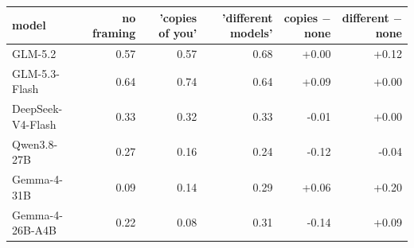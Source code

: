 \begin{tabular}{lrrrrr}
\toprule
\textbf{model} & \textbf{no framing} & \textbf{'copies of you'} & \textbf{'different models'} & \textbf{copies $-$ none} & \textbf{different $-$ none} \\
\midrule
GLM-5.2 & 0.57 & 0.57 & 0.68 & +0.00 & +0.12 \\
GLM-5.3-Flash & 0.64 & 0.74 & 0.64 & +0.09 & +0.00 \\
DeepSeek-V4-Flash & 0.33 & 0.32 & 0.33 & -0.01 & +0.00 \\
Qwen3.8-27B & 0.27 & 0.16 & 0.24 & -0.12 & -0.04 \\
Gemma-4-31B & 0.09 & 0.14 & 0.29 & +0.06 & +0.20 \\
Gemma-4-26B-A4B & 0.22 & 0.08 & 0.31 & -0.14 & +0.09 \\
\bottomrule
\end{tabular}
